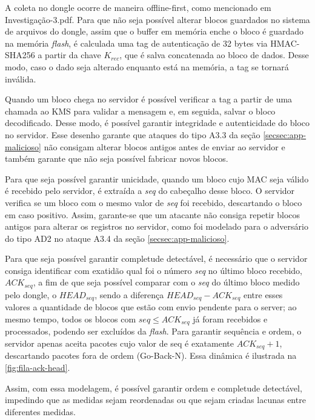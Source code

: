 \documentclass[
	12pt,
	article,			%
	oneside,
	a4paper,
	english,
	brazil				%
	]{abntex2}
\begin{document}
A coleta no dongle ocorre de maneira offline-first, como mencionado em Investigação-3.pdf. Para que não seja possível alterar blocos guardados no sistema de arquivos do dongle,
assim que o buffer em memória enche o bloco é guardado na memória \textit{flash}, é calculada uma tag de autenticação de 32 bytes via HMAC-SHA256 a partir da chave $K_{rec}$, 
que é salva concatenada ao bloco de dados. Desse modo, caso o dado seja alterado enquanto está na memória, a tag se tornará inválida.

Quando um bloco chega no servidor é possível verificar a tag a partir de uma chamada ao KMS para validar a mensagem e, em seguida, salvar o bloco decodificado. Desse modo, é possível garantir 
integridade e autenticidade do bloco no servidor. Esse desenho garante que ataques do tipo A3.3 da seção \ref{secsec:app-malicioso} não consigam alterar blocos antigos antes de enviar
ao servidor e também garante que não seja possível fabricar novos blocos.

Para que seja possível garantir unicidade, quando um bloco cujo MAC seja válido é recebido pelo servidor, é extraída a \textit{seq} do cabeçalho desse bloco. O servidor verifica se um
bloco com o mesmo valor de \textit{seq} foi recebido, descartando o bloco em caso positivo. Assim, garante-se que um atacante não consiga repetir blocos antigos para alterar os registros
no servidor, como foi modelado para o adversário do tipo AD2 no ataque A3.4 da seção \ref{secsec:app-malicioso}. 

Para que seja possível garantir completude detectável, é necessário que o servidor consiga identificar com exatidão qual foi o número \textit{seq} no último bloco recebido, $ACK_{seq}$, a fim
de que seja possível comparar com o \textit{seq} do último bloco medido pelo dongle, o $HEAD_{seq}$, sendo a diferença $HEAD_{seq} - ACK_{seq}$ entre esses valores a quantidade de blocos
que estão com envio pendente para o server; ao mesmo tempo, todos os blocos com $seq \leq ACK_{seq}$ já foram recebidos e processados, podendo ser excluídos da \textit{flash}. Para garantir sequência e ordem, 
o servidor apenas aceita pacotes cujo valor de seq é exatamente $ACK_{seq} + 1$, descartando pacotes fora de 
ordem (Go-Back-N). Essa dinâmica é ilustrada na \autoref{fig:fila-ack-head}.

Assim, com essa modelagem, é possível garantir ordem e completude detectável, impedindo que as medidas sejam reordenadas ou que sejam criadas lacunas entre diferentes medidas.
\end{document}
